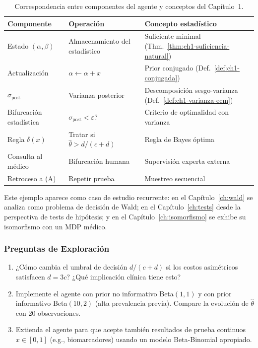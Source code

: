 \begin{table}[htbp]
    \centering
    \caption{Correspondencia entre componentes del agente y conceptos del Capítulo~1.}
    \label{tab:ch1-nodos-diagnostico}
    \begin{tabular}{@{}p{3cm}p{4.2cm}p{4.5cm}@{}}
        \toprule
        \textbf{Componente} & \textbf{Operación} & \textbf{Concepto estadístico} \\
        \midrule
        Estado $(\alpha,\beta)$     & Almacenamiento del estadístico & Suficiente minimal (Thm.~\ref{thm:ch1-suficiencia-natural}) \\
        Actualización               & $\alpha \leftarrow \alpha+x$   & Prior conjugado (Def.~\ref{def:ch1-conjugada}) \\
        $\sigma_{\text{post}}$      & Varianza posterior             & Descomposición sesgo-varianza (Def.~\ref{def:ch1-varianza-ecm}) \\
        Bifurcación estadística     & $\sigma_{\text{post}} < \varepsilon$? & Criterio de optimalidad con varianza \\
        Regla $\delta(x)$           & Tratar si $\hat{\theta} > d/(c+d)$ & Regla de Bayes óptima \\
        Consulta al médico          & Bifurcación humana             & Supervisión experta externa \\
        Retroceso a (A)             & Repetir prueba                 & Muestreo secuencial \\
        \bottomrule
    \end{tabular}
\end{table}

Este ejemplo aparece como caso de estudio recurrente: en el
Capítulo~\ref{ch:wald} se analiza como problema de decisión de Wald; en
el Capítulo~\ref{ch:tests} desde la perspectiva de tests de hipótesis; y en el
Capítulo~\ref{ch:isomorfismo} se exhibe su isomorfismo con un MDP médico.

\subsubsection*{Preguntas de Exploración}

\begin{enumerate}
    \item ¿Cómo cambia el umbral de decisión $d/(c+d)$ si los costos asimétricos
          satisfacen $d = 3c$? ¿Qué implicación clínica tiene esto?
    \item Implemente el agente con prior no informativo Beta$(1,1)$
          y con prior informativo Beta$(10,2)$ (alta prevalencia previa).
          Compare la evolución de $\hat\theta$ con 20 observaciones.
    \item Extienda el agente para que acepte también resultados de prueba
          continuos $x \in [0,1]$ (e.g., biomarcadores) usando un modelo
          Beta-Binomial apropiado.
\end{enumerate}

